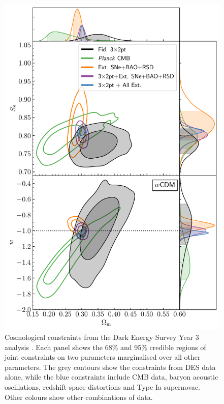 \begin{figure}
\centering
\includegraphics[width=.8\textwidth]{des_y3}
\caption{Cosmological constraints from the Dark Energy Survey Year 3 analysis \citep{DES2021}. Each panel shows the 68\% and 95\% credible regions of joint constraints on two parameters marginalised over all other parameters. The grey contours show the constraints from DES data alone, while the blue constraints include \Planck{} CMB data, baryon acoustic oscillations, redshift-space distortions and Type Ia supernovae. Other colours show other combinations of data.}
\label{co_Fig:des_y3}
\end{figure}

